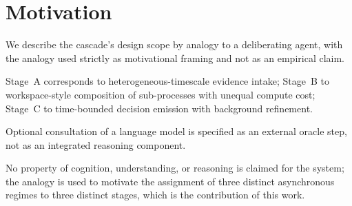 \section{Motivation}
\label{sec:motivation}

We describe the cascade's design scope by analogy to a deliberating agent,
with the analogy used strictly as motivational framing and not as an
empirical claim.

Stage~A corresponds to heterogeneous-timescale evidence intake; Stage~B to
workspace-style composition of sub-processes with unequal compute cost;
Stage~C to time-bounded decision emission with background refinement.

Optional consultation of a language model is specified as an external
oracle step, not as an integrated reasoning component.

No property of cognition, understanding, or reasoning is claimed for the
system; the analogy is used to motivate the assignment of three distinct
asynchronous regimes to three distinct stages, which is the contribution of
this work.
